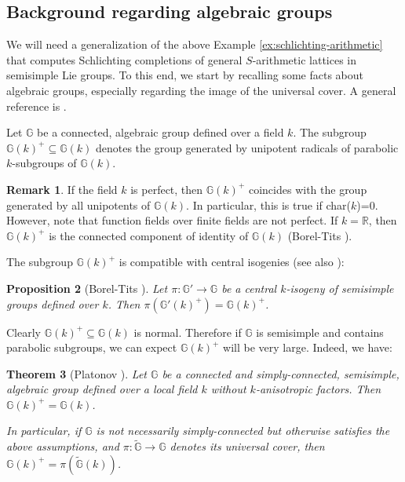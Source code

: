 \documentclass[11pt]{article}
\numberwithin{equation}{section}\providecommand{\llangle}{\langle\!\langle}\providecommand{\rrangle}{\rangle\!\rangle}\providecommand{\Asterisk}{\ast}
\newcommand{\bbG}{\ensuremath{\mathbb{G}}}
\newcommand{\bbR}{\ensuremath{\mathbb{R}}}
\newtheorem{thm}{Theorem}[section]
\newtheorem{prop}[thm]{Proposition}
\theoremstyle{definition}
\newtheorem{rem}[thm]{Remark}
\begin{document}
\subsection{Background regarding algebraic groups}\label{sec:back}
We will need a generalization of the above Example \ref{ex:schlichting-arithmetic} that computes Schlichting completions of general $S$-arithmetic lattices in semisimple Lie groups. To this end, we start by recalling some facts about algebraic groups, especially regarding the image of the universal cover. A general reference is \cite[\S\S 1.1 \& 1.2]{margulis-book}.

Let $\bbG$ be a connected, algebraic group defined over a field $k$. The subgroup $\bbG(k)^+\subseteq \bbG(k)$ denotes the group generated by unipotent radicals of parabolic $k$-subgroups of $\bbG(k)$.

\begin{rem} If the field $k$ is perfect, then $\bbG(k)^+$ coincides with the group generated by all unipotents of $\bbG(k)$. In particular, this is true if char($k$)=0. However, note that function fields over finite fields are not perfect. If $k=\bbR$, then $\bbG(k)^+$ is the connected component of identity of $\bbG(k)$ (Borel-Tits \cite[Prop.\,6.14]{borel-tits-morphismes-abstraits}).\end{rem}
The subgroup $\bbG(k)^+$ is compatible with central isogenies (see also \cite[Prop.\,I.1.5.5]{margulis-book}):
\begin{prop}[{Borel-Tits \cite[Cor.\,6.3]{borel-tits-morphismes-abstraits}}]\label{prop:plus-isogeny}
Let $\pi:\bbG'\to \bbG$ be a central $k$\nobreakdash-isogeny of semisimple groups defined over $k$. Then $\pi(\bbG'(k)^+)=\bbG(k)^+$. \end{prop}
Clearly $\bbG(k)^+\subseteq \bbG(k)$ is normal. Therefore if $\bbG$ is semisimple and contains parabolic subgroups, we can expect $\bbG(k)^+$ will be very large. Indeed, we have:
\begin{thm}[{Platonov \cite{platonov-ktconj}}]\label{thm:ktconj}
Let $\bbG$ be a connected and simply-connected, semisimple, algebraic group defined over a local field $k$ without $k$-anisotropic factors. Then $\bbG(k)^+=\bbG(k)$.

In particular, if $\bbG$ is not necessarily simply-connected but otherwise satisfies the above assumptions, and $\pi:\widetilde{\bbG}\to\bbG$ denotes its universal cover, then $\bbG(k)^+=\pi(\widetilde{\bbG}(k))$.
\end{thm}
\end{document}

